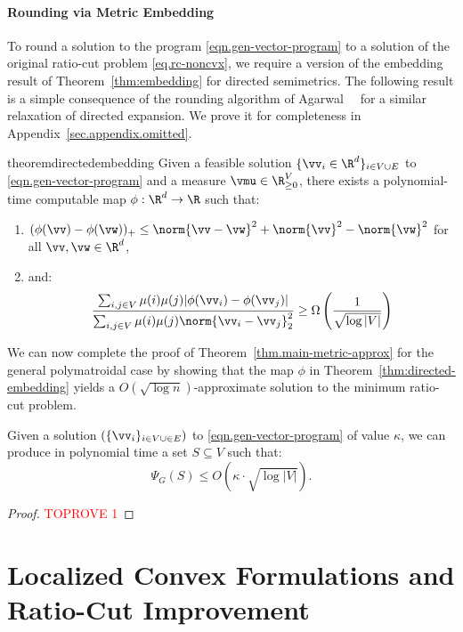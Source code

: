 \documentclass[letterpaper]{article}
\begin{document}
\paragraph{Rounding via Metric Embedding}
To round a solution to the program \eqref{eqn.gen-vector-program} to a solution of the original ratio-cut problem \eqref{eq.rc-noncvx}, we require a version of the embedding result of Theorem~\ref{thm:embedding} for directed semimetrics. The following result is a simple consequence of the rounding algorithm of Agarwal~\etal~\cite{agarwal2005log} for a similar relaxation of directed expansion. We prove it for completeness in Appendix~\ref{sec.appendix.omitted}.

\begin{restatable}{theorem}{directedembedding}
\label{thm:directed-embedding}
    Given a feasible solution $\{\vv_i \in \R^d\}_{i\in V\cup E}$ to \ref{eqn.gen-vector-program} and a measure $\vmu \in \R_{\geq 0}^V$, there exists a polynomial-time computable map $\phi:\R^d \to \R$ such that:
    \begin{enumerate}
        \item $(\phi(\vv)- \phi(\vw))_+ \leq \norm{\vv - \vw}^2 + \norm{\vv}^2 - \norm{\vw}^2$ for all $\vv, \vw \in \R^d$,
        \item and:
        \[
        \frac{\sum_{i,j \in V} \mu(i) \mu(j) |\phi(\vv_i) - \phi(\vv_j)|} {\sum_{i,j \in V} \mu(i) \mu(j) \norm{\vv_i - \vv_j}^2_2 } \geq \Omega \left(\frac{1}{\sqrt{\log |V|}}\right)
        \]
    \end{enumerate}
\end{restatable}

We can now complete the proof of Theorem~\ref{thm.main-metric-approx} for the general polymatroidal case by showing that the map $\phi$ in Theorem~\ref{thm:directed-embedding} yields a $O(\sqrt{\log n})$-approximate solution to the minimum ratio-cut problem.


\begin{lemma}
    Given a solution $(\{\vv_i\}_{i\in V \cup \in E})$ to \ref{eqn.gen-vector-program} of value $\kappa$, we can produce in polynomial time a set $S \subseteq V$ such that:
    $$
    \Psi_G(S) \leq O(\kappa \cdot \sqrt{\log |V|}).
    $$
\end{lemma}
\begin{proof}\textcolor{red}{TOPROVE 1}\end{proof}
 

\section{Localized Convex Formulations and Ratio-Cut Improvement}
\label{sec.ci}
\end{document}
